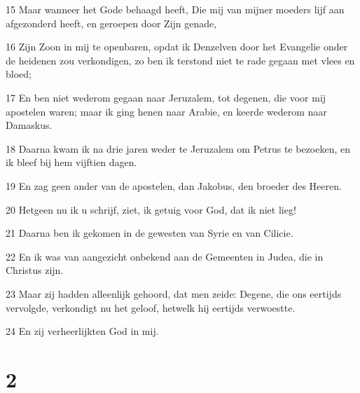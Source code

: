 \par 15 Maar wanneer het Gode behaagd heeft, Die mij van mijner moeders lijf aan afgezonderd heeft, en geroepen door Zijn genade,
\par 16 Zijn Zoon in mij te openbaren, opdat ik Denzelven door het Evangelie onder de heidenen zou verkondigen, zo ben ik terstond niet te rade gegaan met vlees en bloed;
\par 17 En ben niet wederom gegaan naar Jeruzalem, tot degenen, die voor mij apostelen waren; maar ik ging henen naar Arabie, en keerde wederom naar Damaskus.
\par 18 Daarna kwam ik na drie jaren weder te Jeruzalem om Petrus te bezoeken, en ik bleef bij hem vijftien dagen.
\par 19 En zag geen ander van de apostelen, dan Jakobus, den broeder des Heeren.
\par 20 Hetgeen nu ik u schrijf, ziet, ik getuig voor God, dat ik niet lieg!
\par 21 Daarna ben ik gekomen in de gewesten van Syrie en van Cilicie.
\par 22 En ik was van aangezicht onbekend aan de Gemeenten in Judea, die in Christus zijn.
\par 23 Maar zij hadden alleenlijk gehoord, dat men zeide: Degene, die ons eertijds vervolgde, verkondigt nu het geloof, hetwelk hij eertijds verwoestte.
\par 24 En zij verheerlijkten God in mij.

\chapter{2}

